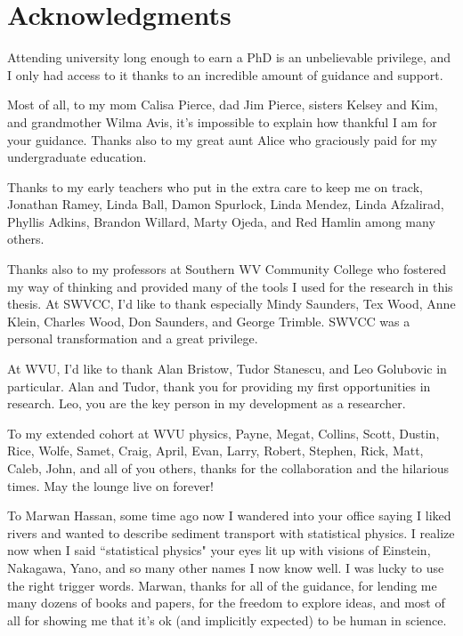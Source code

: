 
\chapter{Acknowledgments}

Attending university long enough to earn a PhD is an unbelievable privilege, and I only had access to it thanks to an incredible amount of guidance and support.

Most of all, to my mom Calisa Pierce, dad Jim Pierce, sisters Kelsey and Kim, and grandmother Wilma Avis, it's impossible to explain how thankful I am for your guidance. Thanks also to my great aunt Alice who graciously paid for my undergraduate education.

Thanks to my early teachers who put in the extra care to keep me on track, Jonathan Ramey, Linda Ball, Damon Spurlock, Linda Mendez, Linda Afzalirad, Phyllis Adkins, Brandon Willard, Marty Ojeda, and Red Hamlin among many others.
	
Thanks also to my professors at Southern WV Community College who fostered my way of thinking and provided many of the tools I used for the research in this thesis.
At SWVCC, I'd like to thank especially Mindy Saunders, Tex Wood, Anne Klein, Charles Wood, Don Saunders, and George Trimble. SWVCC was a personal transformation and a great privilege. 

At WVU, I'd like to thank Alan Bristow, Tudor Stanescu, and Leo Golubovic in particular. Alan and Tudor, thank you for providing my first opportunities in research. Leo, you are the key person in my development as a researcher.

To my extended cohort at WVU physics, Payne, Megat, Collins, Scott, Dustin, Rice, Wolfe, Samet, Craig, April, Evan, Larry, Robert, Stephen, Rick, Matt, Caleb, John, and all of you others, thanks for the collaboration and the hilarious times. May the lounge live on forever!

To Marwan Hassan, some time ago now I wandered into your office saying I liked rivers and wanted to describe sediment transport with statistical physics. I realize now when I said ``statistical physics" your eyes lit up with visions of Einstein, Nakagawa, Yano, and so many other names I now know well. I was lucky to use the right trigger words.
Marwan, thanks for all of the guidance, for lending me many dozens of books and papers, for the freedom to explore ideas, and most of all for showing me that it's ok (and implicitly expected) to be human in science. 

